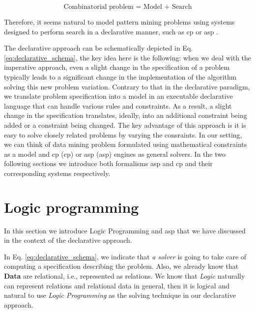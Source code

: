 \begin{center}
\begin{equation}\label{eq:declarative_schema}
  \text{Combinatorial problem = Model + Search}
\end{equation}
\end{center}

Therefore, it seems natural to model pattern mining problems 
using systems designed to perform search in a declarative manner, such
as \acrlong{cp} \parencite{handbookcp} or \acrlong{asp}
\parencite{whatisasp}. %

\pubrev


The declarative approach can be schematically depicted in Eq.
\ref{eq:declarative_schema}, the key idea here is the following: when
we deal with the imperative approach, even a slight change in the
specification of a problem typically leads to a significant change in
the implementation of the algorithm solving this new problem
variation. Contrary to that in the declarative paradigm, we translate
problem specification into a model in an executable declarative language that can
handle various rules and constraints. As a result, a slight change in
the specification translates, ideally, into an additional constraint
being added or a constraint being changed. The key advantage of this
approach is it is easy to solve  closely related problems by varying
the consraints. In our setting, we can think of data
mining problem formulated using mathematical constraints as a
model and \acrlong{cp} (\acrshort{cp}) or \acrlong{asp}
(\acrshort{asp}) engines
as general solvers. In the two following sections we introduce both
formalisms \acrshort{asp} and \acrshort{cp} and their corresponding systems respectively.



\section{Logic programming}\label{sec:logic_programming}
In this section we introduce Logic Programming and \acrlong{asp} that
we have discussed in the context of the declarative approach.


\pubrev
In Eq. \ref{eq:declarative_schema}, we indicate that \textit{a solver}
is going to take care of computing a specification describing the
problem. Also, we already know that \textbf{Data} are relational, i.e., represented as relations. We know that \textit{Logic} naturally can represent relations and relational data in general, then it is logical and natural to use \textit{Logic Programming} as the solving technique in our declarative approach.
\pubrev

